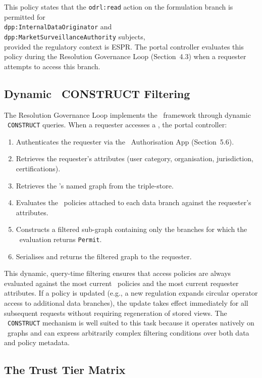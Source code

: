 This policy states that the \texttt{odrl:read} action on the formulation branch
is permitted for \\ \texttt{dpp:InternalDataOriginator} and \\
\texttt{dpp:MarketSurveillanceAuthority} subjects, \\ provided the regulatory
context is ESPR. The portal controller evaluates this policy during the
Resolution Governance Loop (Section~4.3) when a requester attempts to access
this branch.

\subsection{Dynamic \SPARQL\ CONSTRUCT Filtering}

The Resolution Governance Loop implements the \ABAC\ framework through dynamic
\SPARQL\ \texttt{CONSTRUCT} queries. When a requester accesses a \DPP, the
portal controller:

\begin{enumerate}
\item Authenticates the requester via the \EC\ Authorisation App (Section~5.6).
\item Retrieves the requester's attributes (user category, organisation,
jurisdiction, certifications).
\item Retrieves the \DPP's named graph from the triple-store.
\item Evaluates the \ODRL\ policies attached to each data branch against the
requester's attributes.
\item Constructs a filtered sub-graph containing only the branches for which the
\ODRL\ evaluation returns \texttt{Permit}.
\item Serialises and returns the filtered graph to the requester.
\end{enumerate}

This dynamic, query-time filtering ensures that access policies are always
evaluated against the most current \ODRL\ policies and the most current
requester attributes. If a policy is updated (e.g., a new regulation expands
circular operator access to additional data branches), the update takes effect
immediately for all subsequent requests without requiring regeneration of stored
views. The \SPARQL\ \texttt{CONSTRUCT} mechanism is well suited to this task
because it operates natively on \RDF\ graphs and can express arbitrarily complex
filtering conditions over both data and policy metadata.

\subsection{The Trust Tier Matrix}

